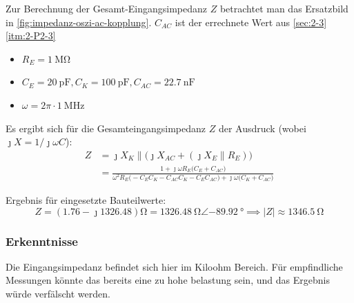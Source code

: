 Zur Berechnung der Gesamt-Eingangsimpedanz $Z$ betrachtet man das Ersatzbild in
\autoref{fig:impedanz-oszi-ac-kopplung}. $C_{AC}$ ist der errechnete Wert aus
\autoref{sec:2-3} \autoref{itm:2-P2-3}
\begin{itemize}[noitemsep]
	\item $R_E =\SI{1}{\mega\ohm}$
	\item $C_E =\SI{20}{\pico\farad}, C_K=\SI{100}{\pico\farad}, C_{AC}=\SI{22.7}{\nano\farad}$
	\item $\omega =2\pi\cdot \SI{1}{\mega\hertz}$
\end{itemize}

Es ergibt sich für die Gesamteingangsimpedanz $Z$ der Ausdruck (wobei $\jmath X = 1/\jmath\omega C$):
\begin{align}
	Z &= \jmath X_K \parallel \bigl(\jmath X_{AC} + (\jmath X_{E} \parallel R_E)\bigr) \nonumber\\
	&= \frac{
		1 + \jmath\omega R_E\bigl(C_{E} + C_{AC}\bigr)
	}{
		\omega^2 R_E\bigl(-C_E C_K - C_{AC} C_K - C_E C_{AC}\bigr) +
		\jmath \omega\bigl(C_K + C_{AC}\bigr)
	}
\label{eq:eingangswiderstand_oszi}
\end{align}

Ergebnis für eingesetzte Bauteilwerte:
\[
Z = (1.76-\jmath 1326.48)\si{\ohm} 
  = \SI{1326.48}{\ohm} \angle \SI{-89.92}{\degree}
  \implies |Z| \approx \SI{1346.5}{\ohm}
\]

\subsubsection{Erkenntnisse}

Die Eingangsimpedanz befindet sich hier im Kiloohm Bereich. Für empfindliche
Messungen könnte das bereits eine zu hohe belastung sein, und das Ergebnis
würde verfälscht werden.


